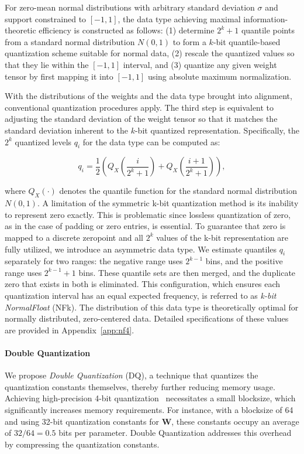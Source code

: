 For zero-mean normal distributions with arbitrary standard deviation $\sigma$ and support constrained to $[-1, 1]$, the data type achieving maximal information-theoretic efficiency is constructed as follows: (1) determine $2^k+1$ quantile points from a standard normal distribution $N(0, 1)$ to form a $k$-bit quantile-based quantization scheme suitable for normal data, (2) rescale the quantized values so that they lie within the $[-1, 1]$ interval, and (3) quantize any given weight tensor by first mapping it into $[-1, 1]$ using absolute maximum normalization.

With the distributions of the weights and the data type brought into alignment, conventional quantization procedures apply. The third step is equivalent to adjusting the standard deviation of the weight tensor so that it matches the standard deviation inherent to the $k$-bit quantized representation. Specifically, the $2^k$ quantized levels $q_i$ for the data type can be computed as:

\begin{equation}
q_i  = \frac{1}{2}\left( Q_X\left(\frac{i}{2^k+1}\right) + Q_X\left(\frac{i+1}{2^k+1}\right)\right),
\end{equation}

where $Q_X(\cdot)$ denotes the quantile function for the standard normal distribution $N(0,1)$. A limitation of the symmetric k-bit quantization method is its inability to represent zero exactly. This is problematic since lossless quantization of zero, as in the case of padding or zero entries, is essential. To guarantee that zero is mapped to a discrete zeropoint and all $2^k$ values of the k-bit representation are fully utilized, we introduce an asymmetric data type. We estimate quantiles $q_i$ separately for two ranges: the negative range uses $2^{k-1}$ bins, and the positive range uses $2^{k-1} + 1$ bins. These quantile sets are then merged, and the duplicate zero that exists in both is eliminated. This configuration, which ensures each quantization interval has an equal expected frequency, is referred to as \emph{k-bit NormalFloat} (NFk). The distribution of this data type is theoretically optimal for normally distributed, zero-centered data. Detailed specifications of these values are provided in Appendix~\ref{app:nf4}.

\paragraph{Double Quantization{}} 
We propose \emph{Double Quantization} (DQ), a technique that quantizes the quantization constants themselves, thereby further reducing memory usage. Achieving high-precision 4-bit quantization~\citep{dettmers2022case} necessitates a small blocksize, which significantly increases memory requirements. For instance, with a blocksize of 64 and using 32-bit quantization constants for $\mathbf{W}$, these constants occupy an average of $32/64 = 0.5$ bits per parameter. Double Quantization addresses this overhead by compressing the quantization constants.

